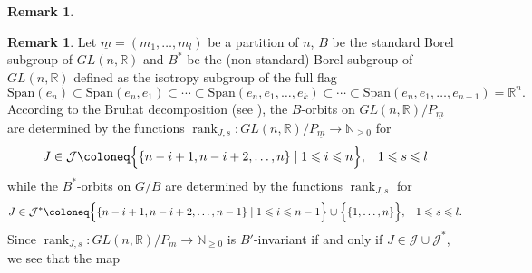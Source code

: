\documentclass[pdftex]{sigma}
\numberwithin{equation}{section}
\theoremstyle{definition}
\newtheorem{Remark}[Theorem]{Remark}
\newcommand{\rank}{\operatorname{rank}}
\newcommand{\R}{\mathbb{R}}
\newcommand{\N}{\mathbb{N}}
\newcommand{\Span}{\mathrm{Span}}
\theoremstyle{plain}
\theoremstyle{plain}
\theoremstyle{plain}
\theoremstyle{plain}
\begin{document}
\begin{Remark}
\begin{center}
	\end{center}
	
	\vspace{1.5cm}
\end{Remark}

\begin{Remark}
	Let $\underline m = (m_1,\dots,m_l)$ be a partition of $n$, $B$ be the standard Borel subgroup of $GL(n,\R)$ and $B^*$ be the (non-standard) Borel subgroup of $GL(n,\R)$ defined as the isotropy subgroup of the full flag
	\begin{equation*}
		\Span(e_n) \subset \Span(e_n,e_1) \subset \cdots \subset \Span(e_n,e_1,\dots,e_k) \subset \cdots \subset \Span(e_n,e_1,\dots,e_{n-1}) = \R^n.
	\end{equation*}
	According to the Bruhat decomposition (see ), the $B$-orbits on $GL(n,\R)/P_{\underline m}$ are determined by the functions $\rank_{J,s} : GL(n,\R)/P_{\underline m} \to \N_{\geqslant 0}$ for
	\begin{equation*}
		J \in \mathcal J \coloneq \Big\{\{n-i+1,n-i+2,\dots,n\} \mid 1\leqslant i \leqslant n\Big\}, \hspace{3mm} 1\leqslant s \leqslant l
	\end{equation*}
	while the $B^*$-orbits on $G/B$ are determined by the functions $\rank_{J,s}$ for
	\begin{equation*}
		J \in \mathcal J^* \coloneq \Big\{\{n-i+1,n-i+2,\dots,n-1\} \mid 1\leqslant i \leqslant n-1\Big\} \cup \Big\{\{1,\dots,n\}\Big\}, \hspace{3mm} 1\leqslant s \leqslant l.
	\end{equation*}
	Since $\rank_{J,s} : GL(n,\R)/P_{\underline m} \to \N_{\geqslant 0}$ is $B'$-invariant if and only if $J \in \mathcal J \cup \mathcal J^*$, we see that the map

\end{Remark}
\end{document}
